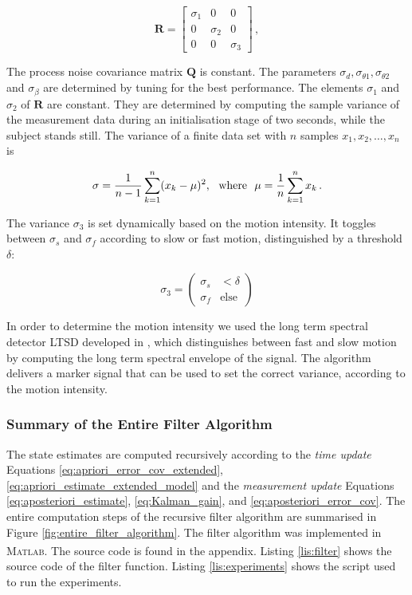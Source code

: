 \begin{equation}
\mathbf{R} = \begin{bmatrix}
  \sigma_1 & 0 & 0\\
  0 & \sigma_2 & 0\\
  0 & 0 & \sigma_3
\end{bmatrix}\,,
\end{equation}

\noindent
The process noise covariance matrix $\mathbf{Q}$ is constant. The parameters $\sigma_d, \sigma_{\theta 1}, \sigma_{\theta 2}$ and $\sigma_{\beta}$ are determined by tuning for the best performance. The elements $\sigma_1$ and $\sigma_2$ of $\mathbf{R}$ are constant. They are determined by computing the sample variance of the measurement data during an initialisation stage of two seconds, while the subject stands still. The variance of a finite data set with $n$ samples $x_1, x_2, \dots, x_n$ is

\begin{equation}
  \sigma = \frac{1}{n-1} \sum_{k=1}^n (x_k - \mu)^2, {\rm \ \ where\ \ } \mu = \frac{1}{n} \sum_{k=1}^n x_k\,.
\end{equation}

\noindent
The variance $\sigma_3$ is set dynamically based on the motion intensity. It toggles between $\sigma_s$ and $\sigma_f$ according to slow or fast motion, distinguished by a threshold $\delta$:

\begin{equation}
  \sigma_3 = \begin{pmatrix}
  	\sigma_s & < \delta\\
  	\sigma_f & \mbox{else}
  \end{pmatrix}
\end{equation}

\noindent
In order to determine the motion intensity we used the long term spectral detector \gls{LTSD} developed in \cite{olivares_vicente_gaitwatch_2013}, which distinguishes between fast and slow motion by computing the long term spectral envelope of the signal. The algorithm delivers a marker signal that can be used to set the correct variance, according to the motion intensity.

\subsubsection{Summary of the Entire Filter Algorithm}

The state estimates are computed recursively according to the \emph{time update} Equations \ref{eq:apriori_error_cov_extended}, \ref{eq:apriori_estimate_extended_model} and the \emph{measurement update} Equations \ref{eq:aposteriori_estimate}, \ref{eq:Kalman_gain}, and \ref{eq:aposteriori_error_cov}. The entire computation steps of the recursive filter algorithm are summarised in Figure \ref{fig:entire_filter_algorithm}. The filter algorithm was implemented in \textsc{Matlab}\textsuperscript{\textregistered}. The source code is found in the appendix. Listing \ref{lis:filter} shows the source code of the filter function. Listing \ref{lis:experiments} shows the script used to run the experiments.


